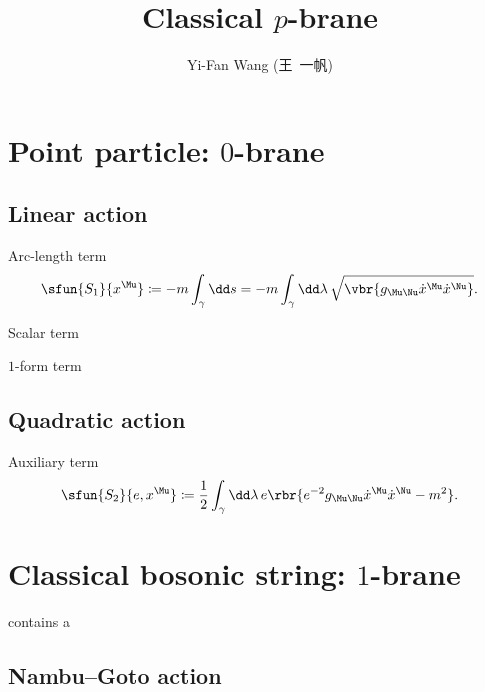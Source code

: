 \documentclass[a4paper,11pt]{article}
\title{Classical $p$-brane}
\author{Yi-Fan Wang (王\ 一帆)}
\begin{document}
\maketitle

\section{Point particle: $0$-brane}
\label{sec:pnt-ptc}

\subsection{Linear action}
\label{sec:pnt-ptc-lin}

Arc-length term
\begin{align}
\sfun{S_1}{x^{\Mu}} \coloneqq -m \int_{\gamma} \dd s = 
-m \int_{\gamma} \dd\lambda\, \sqrt{\vbr{g_{\Mu\Nu}
	\dot{x}^{\Mu} \dot{x}^{\Nu} }}.
\end{align}

Scalar term

$1$-form term

\subsection{Quadratic action}
\label{sec:pnt-ptc-qua}

Auxiliary term
\begin{align}
\sfun{S_2}{e, x^{\Mu}} \coloneqq \frac{1}{2} \int_{\gamma} \dd\lambda\, e
\rbr{e^{-2} g_{\Mu\Nu} \dot{x}^{\Mu} \dot{x}^{\Nu} - m^2}.
\end{align}


\section{Classical bosonic string: $1$-brane}
\label{sec:bos-str}

\cite{Johnson2000} contains a 

\subsection{Nambu--Goto action}
\label{sec:bos-str-nam}
\end{document}
